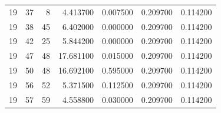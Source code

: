 \begin{table}
\begin{tabular}{rrrrrrr}
19 & 37 & 8 & 4.413700 & 0.007500 & 0.209700 & 0.114200 \\
19 & 38 & 45 & 6.402000 & 0.000000 & 0.209700 & 0.114200 \\
19 & 42 & 25 & 5.844200 & 0.000000 & 0.209700 & 0.114200 \\
19 & 47 & 48 & 17.681100 & 0.015000 & 0.209700 & 0.114200 \\
19 & 50 & 48 & 16.692100 & 0.595000 & 0.209700 & 0.114200 \\
19 & 56 & 52 & 5.371500 & 0.112500 & 0.209700 & 0.114200 \\
19 & 57 & 59 & 4.558800 & 0.030000 & 0.209700 & 0.114200 \\
\bottomrule
\end{tabular}
\end{table}

